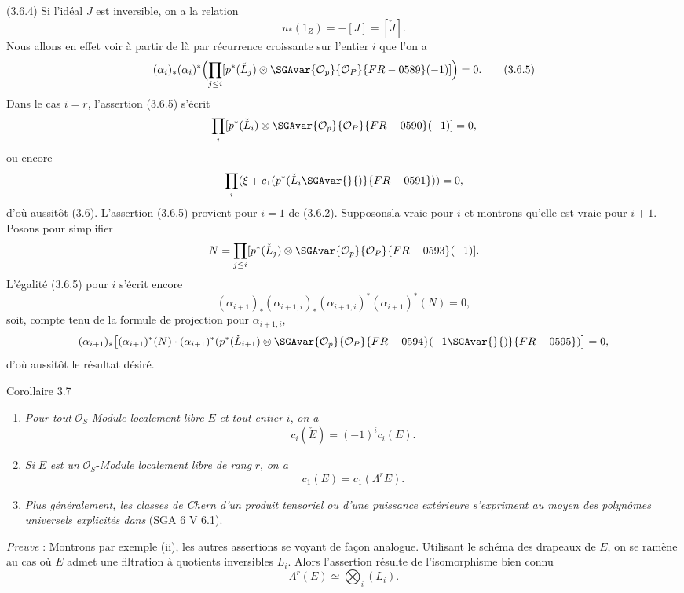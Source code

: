 (3.6.4) Si l'idéal $J$ est inversible, on a la relation
\[
u_*(1_Z)=-[J]=[\check J].
\]
Nous allons en effet voir à partir de là par récurrence croissante sur l'entier $i$ que l'on a
\[
(\alpha_i)_*(\alpha_i)^*\Bigl(\prod_{j\le i}[p^*(\check L_j)\otimes\SGAvar{\mathcal{O}_p}{\mathcal{O}_P}{FR-0589}(-1)]\Bigr)=0.
\tag{3.6.5}
\]
Dans le cas $i=r$, l'assertion (3.6.5) s'écrit
\[
\prod_i[p^*(\check L_i)\otimes\SGAvar{\mathcal{O}_p}{\mathcal{O}_P}{FR-0590}(-1)]=0,
\]
ou encore
\[
\prod_i(\xi+c_1(p^*(\check L_i\SGAvar{}{)}{FR-0591}))=0,
\]
d'où aussitôt (3.6). L'assertion (3.6.5) provient pour $i=1$ de (3.6.2). Supposonsla vraie pour $i$ et montrons qu'elle est vraie pour $i+1$. Posons pour simplifier
\[
N=\prod_{j\le i}[p^*(\check L_j)\otimes\SGAvar{\mathcal{O}_p}{\mathcal{O}_P}{FR-0593}(-1)].
\]
L'égalité (3.6.5) pour $i$ s'écrit encore
\[
(\alpha_{i+1})_*(\alpha_{i+1,i})_*(\alpha_{i+1,i})^*(\alpha_{i+1})^*(N)=0,
\]
soit, compte tenu de la formule de projection pour $\alpha_{i+1,i}$,
\[
(\alpha_{i+1})_*\bigl[(\alpha_{i+1})^*(N)\cdot(\alpha_{i+1})^*(p^*(\check L_{i+1})\otimes\SGAvar{\mathcal{O}_p}{\mathcal{O}_P}{FR-0594}(-1\SGAvar{}{)}{FR-0595})\bigr]=0,
\]
d'où aussitôt le
résultat désiré.

\begin{statement}{Corollaire 3.7}
\begin{enumerate}[label=(\roman*)]
\item \emph{Pour tout} $\mathcal{O}_S$-\emph{Module localement libre} $E$ \emph{et tout entier} $i$, \emph{on a}
\[
c_i(\check E)=(-1)^i c_i(E).
\]
\item \emph{Si} $E$ \emph{est un} $\mathcal{O}_S$-\emph{Module localement libre de rang} $r$, \emph{on a}
\[
c_1(E)=c_1(\Lambda^rE).
\]
\item \emph{Plus généralement, les classes de Chern d'un produit tensoriel ou d'une puissance extérieure s'expriment au moyen des polynômes universels explicités dans} (SGA 6 V 6.1).
\end{enumerate}
\end{statement}

\emph{Preuve} : Montrons par exemple (ii), les autres assertions se voyant de façon analogue. Utilisant le schéma des drapeaux de $E$, on se ramène au cas où $E$ admet une filtration à quotients inversibles $L_i$. Alors l'assertion résulte de l'isomorphisme bien connu
\[
\Lambda^r(E)\simeq\bigotimes_i (L_i).
\]

